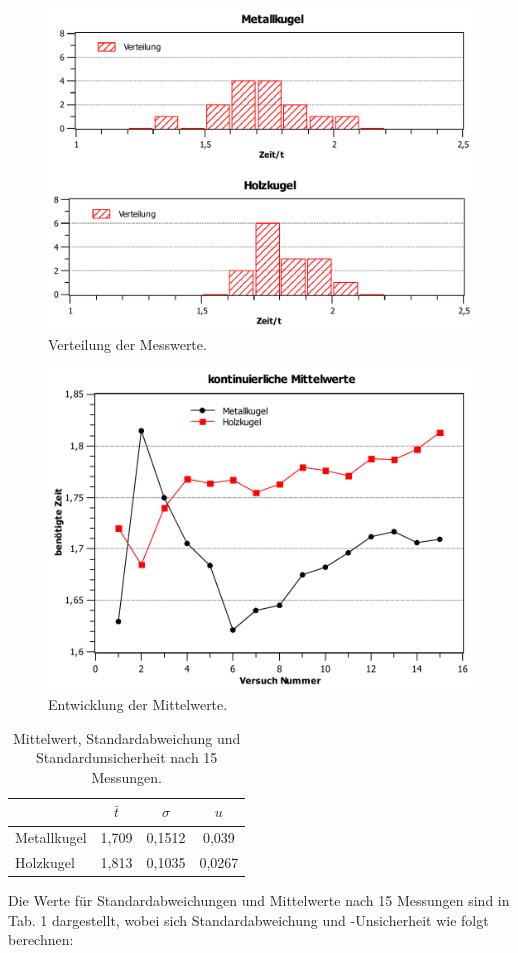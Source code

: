 \documentclass[11pt,a4paper,titlepage, ngerman]{article}
\begin{document}
				\begin{figure}
					\includegraphics[width=\textwidth]{Histogramm_2.pdf}
					\caption{Verteilung der Messwerte.}
					\label{HistogrammV3}							
				\end{figure}
				\begin{figure}	
						\includegraphics[width=\textwidth]{Mittelwerte_2.pdf}
						\caption{Entwicklung der Mittelwerte.}
						\label{MittelwerteV3}										
				\end{figure}								
				\begin{table}
					\label{Tab:VerteilungsWerte}
					\centering
					\begin{tabular}{l|SSS}
						\hline
						& {$\bar{t}$} & {$\sigma$} & {$u$} \\ \hline
						Metallkugel & 1,709 & 0,1512 & 0,039\\
						Holzkugel & 1,813 & 0,1035 & 0,0267\\ \hline
					\end{tabular}
					\caption{Mittelwert, Standardabweichung und Standardunsicherheit nach 15 Messungen.}
				\end{table}					
				Die Werte für Standardabweichungen und Mittelwerte nach 15 Messungen sind in Tab. 1 dargestellt, wobei sich Standardabweichung und -Unsicherheit wie folgt berechnen:
				
\end{document}
